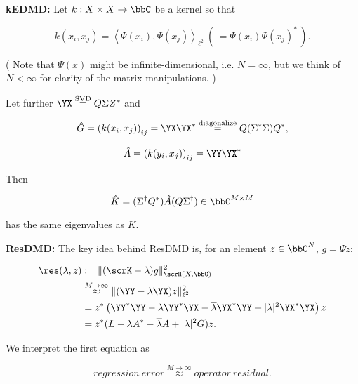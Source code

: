 \textbf{kEDMD:} Let $k : X \times X \to \bbC$ be a kernel so that 

\begin{equation}
    k(x_i, x_j) = \left\langle \Psi (x_i), \Psi (x_j) \right\rangle_{\ell^2}\ \left(\, = 
    \Psi (x_i) \Psi (x_j)^* \,\right) .
\end{equation}

( Note that $\Psi (x)$ might be infinite-dimensional, i.e. $N = \infty$, but we think of 
$N < \infty$ for clarity of the matrix manipulations. )

Let further $\YX \stackrel{\text{SVD}}{=} Q \Sigma Z^*$ and

\begin{equation}
    \hat{G} = \left( k(x_i, x_j) \right)_{i j} = 
    \YX \YX^* 
    \stackrel{\text{diagonalize}}{=} Q (\Sigma^* \Sigma) Q^*, 
\end{equation}

\begin{equation}
    \hat{A} = \left( k(y_i, x_j) \right)_{i j} = 
    \YY \YX^*
\end{equation}

Then 

\begin{equation}
    \hat{K} = ( \Sigma^\dagger Q^* ) \hat{A} ( Q \Sigma^\dagger ) \in \bbC^{M \times M}
\end{equation}

has the same eigenvalues as $K$. 

\textbf{ResDMD:} The key idea behind ResDMD is, for an element $z \in \bbC^N$, 
$g = \Psi z$: 

\begin{align}
    \res (\lambda, z) &:= 
    \| (\scrK - \lambda) g \|_{\scrH (X, \bbC)}^2 \\
    &\stackrel{M \to \infty}{\approx} \| (\YY - \lambda \YX) z \|_{\ell^2}^2 \\
    &= z^* \left( \YY^* \YY - \lambda \YY^* \YX - \overline{\lambda} \YX^* \YY + 
    | \lambda |^2 \YX^* \YX \right) z \\
    &= z^* (L - \lambda A^* - \overline{\lambda} A + | \lambda |^2 G) z . 
\end{align}

We interpret the first equation as 

\begin{equation}
    \label{idea}
    regression\ error \stackrel{M \to \infty}{\approx} operator\ residual .
\end{equation}

